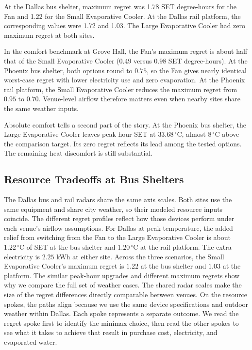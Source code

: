 At the Dallas bus shelter, maximum regret was 1.78 SET degree-hours for the Fan and 1.22 for the Small Evaporative Cooler. At the Dallas rail platform, the corresponding values were 1.72 and 1.03. The Large Evaporative Cooler had zero maximum regret at both sites.

In the comfort benchmark at Grove Hall, the Fan's maximum regret is about half that of the Small Evaporative Cooler ($0.49$ versus $0.98$ SET degree-hours). At the Phoenix bus shelter, both options round to $0.75$, so the Fan gives nearly identical worst-case regret with lower electricity use and zero evaporation. At the Phoenix rail platform, the Small Evaporative Cooler reduces the maximum regret from $0.95$ to $0.70$. Venue-level airflow therefore matters even when nearby sites share the same weather inputs.

Absolute comfort tells a second part of the story. At the Phoenix bus shelter, the Large Evaporative Cooler leaves peak-hour SET at $33.68\,^\circ\mathrm{C}$, almost $8\,^\circ\mathrm{C}$ above the comparison target. Its zero regret reflects its lead among the tested options. The remaining heat discomfort is still substantial.

\subsection{Resource Tradeoffs at Bus Shelters}

The Dallas bus and rail radars share the same axis scales. Both sites use the same equipment and share city weather, so their modeled resource inputs coincide. The different regret profiles reflect how those devices perform under each venue's airflow assumptions. For Dallas at peak temperature, the added relief from switching from the Fan to the Large Evaporative Cooler is about $1.22\,^{\circ}\mathrm{C}$ of SET at the bus shelter and $1.20\,^{\circ}\mathrm{C}$ at the rail platform. The extra electricity is $2.25$ kWh at either site. Across the three scenarios, the Small Evaporative Cooler's maximum regret is $1.22$ at the bus shelter and $1.03$ at the platform. The similar peak-hour upgrades and different maximum regrets show why we compare the full set of weather cases. The shared radar scales make the size of the regret differences directly comparable between venues. On the resource spokes, the paths align because we use the same device specifications and outdoor weather within Dallas. Each spoke represents a separate outcome. We read the regret spoke first to identify the minimax choice, then read the other spokes to see what it takes to achieve that result in purchase cost, electricity, and evaporated water.

